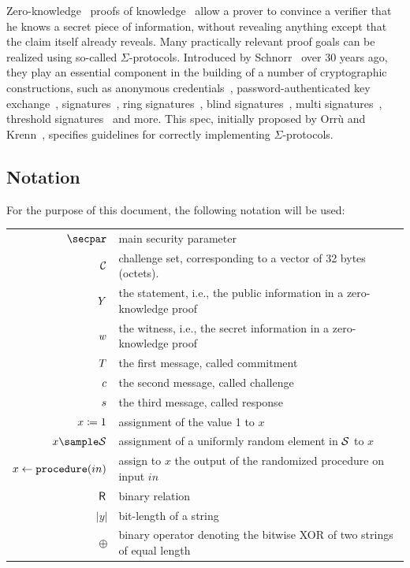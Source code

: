 \documentclass[11pt]{article}
\begin{document}
Zero-knowledge~\cite{GolMicRac89} proofs of knowledge~\cite{C:BelGol92} allow a prover to convince a verifier that he knows a secret piece of information, without revealing anything except that the claim itself already reveals.
Many practically relevant proof goals can be realized using so-called $\Sigma$-protocols.
Introduced by Schnorr~\cite{JC:Schnorr91} over 30 years ago, they play an essential component in the building of a number of cryptographic
constructions,
such as anonymous credentials~\cite{CCS:ChaMeiZav14}, password-authenticated key exchange~\cite{jpake}, signatures~\cite{C:Schnorr89},
ring signatures~\cite{borromeansig}, blind signatures~\cite{CCS:PoiSte97}, multi signatures~\cite{CCS:NRSW20}, threshold signatures~\cite{EPRINT:KomGol20} and more. This spec, initially proposed by Orrù and Krenn~\cite{sigma-proposal}, specifies guidelines for correctly implementing $\Sigma$-protocols.

\subsection{Notation}
\label{sec:notation}

For the purpose of this document, the following notation will be used:

\begin{tabular}{r@{\hspace{1em}}p{11cm}}
    $\secpar$ & main security parameter\\
    $\mathcal{C}$ & challenge set, corresponding to a vector of 32 bytes (octets).\\
    $Y$ & the statement, i.e., the public information in a zero-knowledge proof \\
    $w$ & the witness, i.e., the secret information in a zero-knowledge proof \\
    $T$ & the first message, called commitment \\
    $c$ & the second message, called challenge \\
    $s$ & the third message, called response \\
    $x \coloneqq 1$ & assignment of the value 1 to $x$\\
    $x\sample\someset$ & assignment of a uniformly random element in $\mathcal{S}$ to $x$\\
    $x\gets\texttt{procedure}(in)$ & assign to $x$ the output of the randomized procedure on input $in$\\
    ${\mathsf{R}_{\operatorname{{}}}}$ & binary relation\\
    $|y|$ & bit-length of a string \\
    $\oplus$ & binary operator denoting the bitwise XOR of two strings of equal length
\end{tabular}
\end{document}

